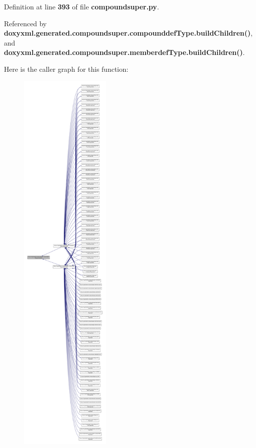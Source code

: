 Definition at line {\bf 393} of file {\bf compoundsuper.\+py}.



Referenced by {\bf doxyxml.\+generated.\+compoundsuper.\+compounddef\+Type.\+build\+Children()}, and {\bf doxyxml.\+generated.\+compoundsuper.\+memberdef\+Type.\+build\+Children()}.



Here is the caller graph for this function\+:
\nopagebreak
\begin{figure}[H]
\begin{center}
\leavevmode
\includegraphics[height=550pt]{dc/d6a/classdoxyxml_1_1generated_1_1compoundsuper_1_1compounddefType_a4ade8a3f8a23978aa129f93d49cdecb0_icgraph}
\end{center}
\end{figure}


